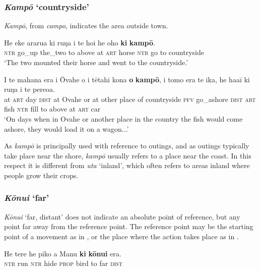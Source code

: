 \subsubsection{\textit{Kampō} ‘countryside’}\label{sec:3.6.3.3}
\textit{Kampō}, from  \textit{campo}, indicates the area outside town. 

\ea\label{ex:3.169}
\gll He eke ararua ki ruŋa i te hoi he oho \textbf{ki} \textbf{kampō}. \\
\textsc{ntr} go\_up the\_two to above at \textsc{art} horse \textsc{ntr} go to countryside \\

\glt 
‘The two mounted their horse and went to the countryside.’ \textstyleExampleref{[R178.013]} 
\z

\ea\label{ex:3.170}
\gll {\ꞌ}I te mahana era {\ꞌ}i {\ꞌ}Ōvahe {\ꞌ}o {\ꞌ}i tētahi kona \textbf{o} \textbf{kampō}, i tomo era  te ika, he ha{\ꞌ}a{\ꞌ}ī ki ruŋa i te pere{\ꞌ}oa.\\
at \textsc{art} day \textsc{dist} at Ovahe or at other place of countryside \textsc{pfv} go\_ashore \textsc{dist}  \textsc{art} fish \textsc{ntr} fill to above at \textsc{art} car\\

\glt
‘On days when in Ovahe or another place in the country the fish would come ashore, they would load it on a wagon...’ \textstyleExampleref{[R539-1.482]}
\z

As \textit{kampō} is principally used with reference to outings, and as outings typically take place near the shore, \textit{kampō} usually refers to a place near the coast. In this respect it is different from \textit{{\ꞌ}uta} ‘inland’, which often refers to areas inland where people grow their crops.

\subsubsection{\textit{Kōnui} ‘far’}\label{sec:3.6.3.4}
\textit{Kōnui} ‘far, distant’ does not indicate an absolute point of reference, but any point far away from the reference point. The reference point may be the starting point of a movement as in , or the place where the action takes place as in . 

\ea\label{ex:3.171}
\gll He tere he piko a Manu \textbf{ki} \textbf{kōnui} era. \\
\textsc{ntr} run \textsc{ntr} hide \textsc{prop} bird to far \textsc{dist} \\

